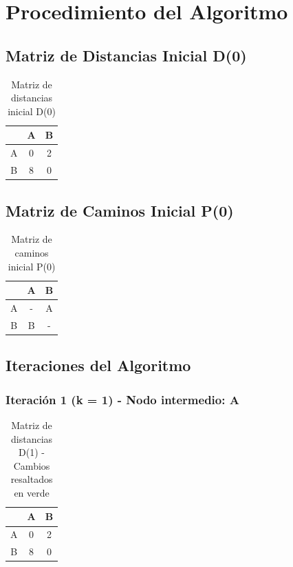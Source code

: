 \documentclass[12pt]{article}
\begin{document}
\clearpage
\section{Procedimiento del Algoritmo}
\subsection{Matriz de Distancias Inicial D(0)}
\begin{table}[h!]
\centering
\begin{tabular}{|c|c|c|}
\hline
 & A & B \\\hline
A & 0 & 2 \\\hline
B & 8 & 0 \\\hline
\end{tabular}
\caption{Matriz de distancias inicial D(0)}
\end{table}

\clearpage
\subsection{Matriz de Caminos Inicial P(0)}
\begin{table}[h!]
\centering
\begin{tabular}{|c|c|c|}
\hline
 & A & B \\\hline
A & - & A \\\hline
B & B & - \\\hline
\end{tabular}
\caption{Matriz de caminos inicial P(0)}
\end{table}

\subsection{Iteraciones del Algoritmo}
\clearpage
\subsubsection{Iteración 1 (k = 1) - Nodo intermedio: A}
\begin{table}[h!]
\centering
\begin{tabular}{|c|c|c|}
\hline
 & A & B \\\hline
A & 0 & 2 \\\hline
B & 8 & 0 \\\hline
\end{tabular}
\caption{Matriz de distancias D(1) - Cambios resaltados en verde}
\end{table}
\end{document}
